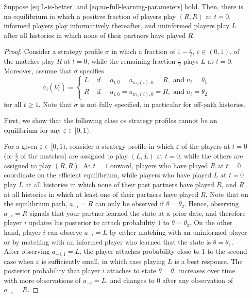 \documentclass[12pt,letterpaper]{article}
\newtheorem{lemma}{\hskip\parindent\bf{Lemma}}
\begin{document}
\begin{lemma}
    Suppose \eqref{eq:L-is-better} and \eqref{eq:no-full-learning-parameters} hold. Then, there is no equilibrium in which a positive fraction of players play $(R,R)$ at $t=0$, informed players play informatively thereafter, and uninformed players play $L$ after all histories in which none of their partners have played $R$.

    \begin{proof}
        Consider a strategy profile $\sigma$ in which a fraction of $1-\frac{\varepsilon}{2}$, $\varepsilon\in(0,1)$, of the matches play $R$ at $t=0$, while the remaining fraction $\frac{\varepsilon}{2}$ plays $L$ at $t=0$. Moreover, assume that $\sigma$ specifies \begin{equation*}
            \sigma_i(h^t_i)=\begin{cases}
            L & \text{ if } \quad a_{i,0}=a_{m_0(i),0}=R, \text{ and } u_i=\theta_1\\
            R & \text{ if } \quad a_{i,0}=a_{m_0(i),0}=R, \text{ and } u_i=\theta_2
        \end{cases}
        \end{equation*} for all $t\geq 1$. Note that $\sigma$ is not fully specified, in particular for off-path histories.

        First, we show that the following class os strategy profiles cannot be an equilibrium for any $\varepsilon \in [0,1)$. 

        For a given $\varepsilon \in [0,1)$, consider a strategy profile in which $\varepsilon$ of the players at $t=0$ (or $\frac{\varepsilon}{2}$ of the matches) are assigned to play $(L,L)$ at $t=0$, while the others are assigned to play $(R,R)$. At $t=1$ onward, players who have played $R$ at $t=0$ coordinate on the efficient equilibrium, while players who have played $L$ at $t=0$ play $L$ at all histories in which none of their past partners have played $R$, and $R$ at all histories in which at least one of their partners have played $R$. Note that on the equilibrium path, $a_{-i}=R$ can only be observed if $\theta=\theta_2$. Hence, observing $a_{-i}=R$ signals that your partner learned the state at a prior date, and therefore player $i$ updates his posterior to attach probability $1$ to $\theta=\theta_2$. On the other hand, player $i$ can observe $a_{-i}=L$ by either matching with an uninformed player or by matching with an informed player who learned that the state is $\theta=\theta_1$. After observing $a_{-i,1}=L$, the player attaches probability close to $1$ to the second case when $\varepsilon$ is sufficiently small, in which case playing $L$ is a best response. The posterior probability that player $i$ attaches to state $\theta=\theta_1$ increases over time with more observations of $a_{-i}=L$, and changes to $0$ after any observation of $a_{-i}=R$.


\end{proof}
\end{lemma}
\end{document}
